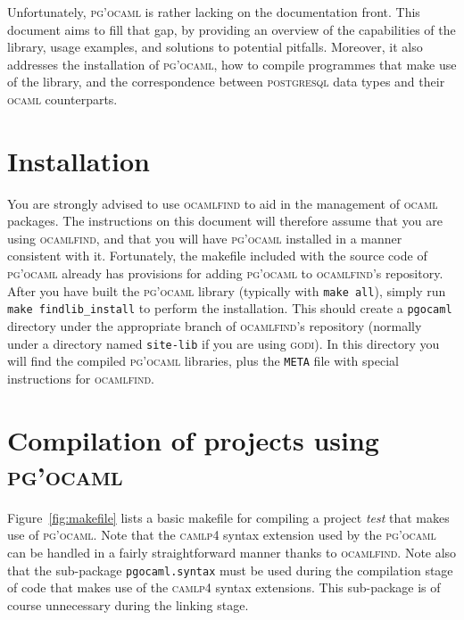 \documentclass[11pt]{article}
\newcommand{\ocaml}{\textsc{ocaml}\xspace}
\newcommand{\ocamlfind}{\textsc{ocamlfind}\xspace}
\newcommand{\postgresql}{\textsc{postgresql}\xspace}
\newcommand{\pgocaml}{\textsc{pg'ocaml}\xspace}
\newcommand{\godi}{\textsc{godi}\xspace}
\newcommand{\camlp}{\textsc{camlp}{\scriptsize 4}\xspace}
\begin{document}
Unfortunately, \pgocaml is rather lacking on the documentation front.  This document
aims to fill that gap, by providing an overview of the capabilities of the library,
usage examples, and solutions to potential pitfalls.  Moreover, it also addresses
the installation of \pgocaml, how to compile programmes that make use of the library,
and the correspondence between \postgresql data types and their \ocaml counterparts.



\section{Installation}
\label{sec:installation}

You are strongly advised to use \ocamlfind to aid in the management of \ocaml packages.
The instructions on this document will therefore assume that you are using \ocamlfind,
and that you will have \pgocaml installed in a manner consistent with it.  Fortunately,
the makefile included with the source code of \pgocaml already has provisions for
adding \pgocaml to \ocamlfind's repository.  After you have built the \pgocaml library
(typically with \texttt{make all}), simply run \texttt{make findlib\_install} to perform
the installation.  This should create a \texttt{pgocaml} directory under the appropriate
branch of \ocamlfind's repository (normally under a directory named \texttt{site-lib}
if you are using \godi).  In this directory you will find the compiled \pgocaml
libraries, plus the \texttt{META} file with special instructions for \ocamlfind.



\section{Compilation of projects using \pgocaml}
\label{makefile}

Figure~\ref{fig:makefile} lists a basic makefile for compiling a project \emph{test}
that makes use of \pgocaml.  Note that the \camlp syntax extension used by the \pgocaml
can be handled in a fairly straightforward manner thanks to \ocamlfind.  Note also
that the sub-package \texttt{pgocaml.syntax} must be used during the compilation
stage of code that makes use of the \camlp syntax extensions.  This sub-package is of
course unnecessary during the linking stage.
\end{document}
